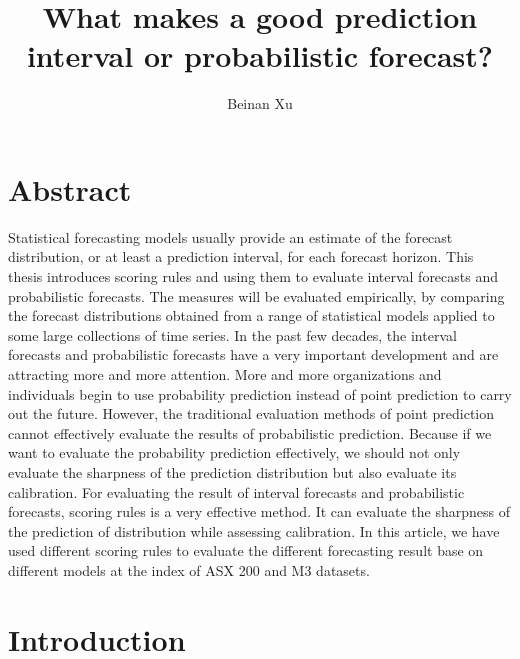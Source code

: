 \documentclass{monashthesis}
\author{Beinan Xu}
\title{What makes a good prediction interval or probabilistic forecast?}
\theoremstyle{definition}
\theoremstyle{definition}
\theoremstyle{definition}
\theoremstyle{remark}
\begin{document}

\titlepage

{\sf\tighttoc\doublespacing}

\clearpage{}\setcounter{page}{0}

\chapter*{Abstract}\label{abstract}

Statistical forecasting models usually provide an estimate of the
forecast distribution, or at least a prediction interval, for each
forecast horizon. This thesis introduces scoring rules and using them to
evaluate interval forecasts and probabilistic forecasts. The measures
will be evaluated empirically, by comparing the forecast distributions
obtained from a range of statistical models applied to some large
collections of time series. In the past few decades, the interval
forecasts and probabilistic forecasts have a very important development
and are attracting more and more attention. More and more organizations
and individuals begin to use probability prediction instead of point
prediction to carry out the future. However, the traditional evaluation
methods of point prediction cannot effectively evaluate the results of
probabilistic prediction. Because if we want to evaluate the probability
prediction effectively, we should not only evaluate the sharpness of the
prediction distribution but also evaluate its calibration. For
evaluating the result of interval forecasts and probabilistic forecasts,
scoring rules is a very effective method. It can evaluate the sharpness
of the prediction of distribution while assessing calibration. In this
article, we have used different scoring rules to evaluate the different
forecasting result base on different models at the index of ASX 200 and
M3 datasets.

\chapter{Introduction}\label{ch:intro}
\end{document}

